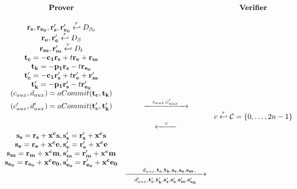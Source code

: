   \begin{figure}[h!]
    \centering
    \begin{equation*}
      \begin{array}{c c c}
        \text{\textbf{Prover}} & & \text{\textbf{Verifier}} \\
        \\
        \mathbf{r_s,r_{e_0},r'_{s},r'_{e_{0}}} \stackrel{r}{\hookleftarrow} D_{\beta_0} & & \\
        \mathbf{r_e,r'_{e}} \stackrel{r}{\hookleftarrow} D_{\beta} & & \\
        \mathbf{r_m,r'_{m}} \stackrel{r}{\hookleftarrow} D_{t} & & \\
        \mathbf{t_c} = \mathbf{-c_1r_s} + t\mathbf{r_e + r_m} & & \\
        \mathbf{t_k} = \mathbf{-p_1r_s} - t\mathbf{r_{e_0}} & & \\
        \mathbf{t'_c} = \mathbf{-c_1r'_s} + t\mathbf{r'_e + r'_m} & & \\
        \mathbf{t'_k} = \mathbf{-p_1r'_s} - t\mathbf{r'_{e_0}} & & \\
        (c_{aux}, d_{aux}) = aCommit(\mathbf{t_c,t_k}) & & \\
        (c'_{aux}, d'_{aux}) = aCommit(\mathbf{t'_c,t'_k}) &
                                                         \xrightarrow{\hspace{1em}c_{aux},c'_{aux}\hspace{1em}} & \\
                               & & c \stackrel{r}{\hookleftarrow} \mathcal{C} = \left\{ 0,\dots, 2n -1  \right\}\\
                               &  \xleftarrow{\hspace{1em}c\hspace{1em}} & \\
        \mathbf{s_s = r_s + x^cs},\mathbf{s'_s = r'_s + x^cs} & & \\
        \mathbf{s_e = r_e + x^ce},\mathbf{s'_e = r'_e + x^ce} & & \\
        \mathbf{s_m = r_m + x^cm},\mathbf{s'_m = r'_m + x^cm} & & \\
        \mathbf{s_{e_0} = r_{e_0} + x^ce_0},\mathbf{s'_{e_0} = r'_{e_0} + x^ce_0} & & \\
                               & \xrightarrow[\hspace{1em}d'_{aux}, \mathbf{t'_c, t'_k, s'_s, s'_e, s'_m,
                                 s'_{e_0}}\hspace{1em}]{\hspace{1em}d_{aux}, \mathbf{t_c, t_k, s_s, s_e, s_m,
}}
\end{array}
\end{equation*}
\end{figure}
